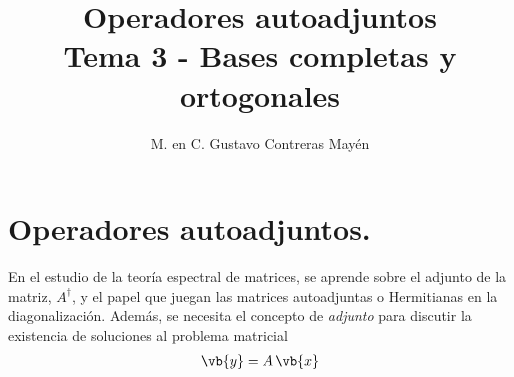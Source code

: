 
\title{Operadores autoadjuntos \\ \large {Tema 3 - Bases completas y ortogonales}\vspace{-3ex}}

\author{M. en C. Gustavo Contreras Mayén}
\date{ }

\pagestyle{fancy}
\fancyhf{}
\lhead{\leftmark}
\rfoot{\thepage}
\setlength{\headheight}{16pt}%



\maketitle
\fontsize{14}{14}\selectfont
\tableofcontents
\newpage

\section{Operadores autoadjuntos.}

En el estudio de la teoría espectral de matrices, se aprende sobre el adjunto de la matriz, $A^{\dagger}$, y el papel que juegan las matrices autoadjuntas o Hermitianas en la diagonalización. Además, se necesita el concepto de \emph{adjunto} para discutir la existencia de soluciones al problema matricial
\begin{align*}
\vb{y} = A \, \vb{x}
\end{align*}

